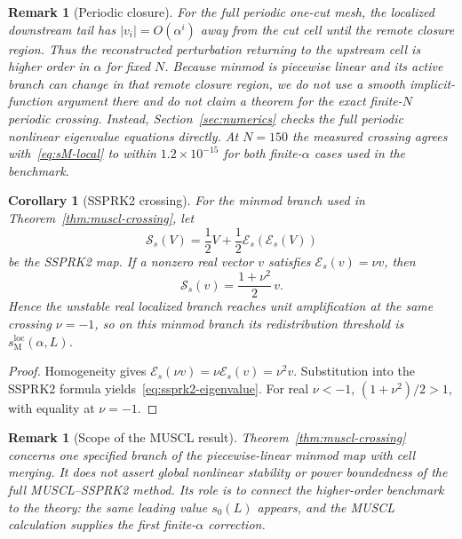 \documentclass[preprint,12pt]{elsarticle}
\newtheorem{corollary}[theorem]{Corollary}
\newtheorem{remark}[theorem]{Remark}
\begin{document}
\begin{remark}[Periodic closure]
\label{rem:muscl-periodic-closure}
For the full periodic one-cut mesh, the localized downstream tail has
$|v_i|=O(\alpha^i)$ away from the cut cell until the remote closure region.
Thus the reconstructed perturbation returning to the upstream cell is
higher order in $\alpha$ for fixed $N$.  Because minmod is piecewise linear
and its active branch can change in that remote closure region, we do not use
a smooth implicit-function argument there and do not claim a theorem for the
exact finite-$N$ periodic crossing.  Instead, Section~\ref{sec:numerics}
checks the full periodic nonlinear eigenvalue equations directly.  At $N=150$
the measured crossing agrees with~\eqref{eq:sM-local} to within
$1.2\times10^{-15}$ for both finite-$\alpha$ cases used in the benchmark.
\end{remark}

\begin{corollary}[SSPRK2 crossing]
\label{cor:muscl-ssprk2}
For the minmod branch used in Theorem~\ref{thm:muscl-crossing}, let
\[
    \mathcal S_s(V)
    =
    \frac12V+\frac12\mathcal E_s(\mathcal E_s(V))
\]
be the SSPRK2 map.  If a nonzero real vector $v$ satisfies $\mathcal E_s(v)=\nu v$,
then
\begin{equation}
    \mathcal S_s(v)
    =
    \frac{1+\nu^2}{2}\,v.
    \label{eq:ssprk2-eigenvalue}
\end{equation}
Hence the unstable real localized branch reaches unit amplification at the
same crossing $\nu=-1$, so on this minmod branch its redistribution
threshold is $s_{\mathrm M}^{\mathrm{loc}}(\alpha,L)$.
\end{corollary}

\begin{proof}
Homogeneity gives
$\mathcal E_s(\nu v)=\nu\mathcal E_s(v)=\nu^2v$.  Substitution into the
SSPRK2 formula yields~\eqref{eq:ssprk2-eigenvalue}.  For real $\nu<-1$,
$(1+\nu^2)/2>1$, with equality at $\nu=-1$.
\end{proof}

\begin{remark}[Scope of the MUSCL result]
\label{rem:muscl-scope}
Theorem~\ref{thm:muscl-crossing} concerns one specified branch of the
piecewise-linear minmod map with cell merging.  It does
not assert global nonlinear stability or power boundedness of the full
MUSCL--SSPRK2 method.  Its role is to connect the higher-order benchmark to
the theory: the same leading value $s_0(L)$ appears, and the MUSCL
calculation supplies the first finite-$\alpha$ correction.
\end{remark}
\end{document}
